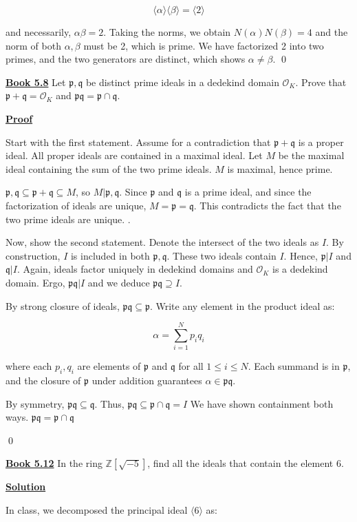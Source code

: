 \documentclass{article}
\newcommand{\new}[1]{
    \vspace{2mm}
    \noindent
    \textbf{
    \underline{#1}}
}
\def\ZZ{{\mathbb{Z}}}
\newcommand{\Proof}{{
    \vspace{2mm}
    \noindent
    \textbf{
    \underline{Proof}}
}
}
\newcommand{\<}{{{
    \langle
}}}
\def\>{{{
    \rangle
}}}
\def\ZZ{{\mathbb{Z}}}
\newcommand{\ringInt}{
    {\mathcal{O}}
}
\newcommand{\pideal}{
    {{\mathfrak{p}}}
}
\newcommand{\qideal}{
    {{\mathfrak{q}}}
}
\begin{document}
\[
    \<\alpha\>\<\beta\> = \<2\>
\]

and necessarily, $\alpha\beta = 2$. Taking the norms, we obtain 
$N(\alpha)N(\beta) = 4$ and the norm of both $\alpha, \beta$ must 
be 2, which is prime. We have factorized 2 into two primes, 
and the two generators are distinct, which shows $\alpha \neq \beta$. 
\qed


\newpage
\new{Book 5.8} Let $\pideal, \qideal$ be distinct prime ideals in 
a dedekind domain $\ringInt_K$. Prove that $\pideal + \qideal = \ringInt_K$
and $\pideal \qideal = \pideal \cap \qideal$. 

\Proof 
Start with the first statement. Assume for a contradiction that 
$\pideal + \qideal$ is a proper ideal. All proper ideals are 
contained in a maximal ideal. Let $M$ be the maximal ideal containing 
the sum of the two prime ideals. $M$ is maximal, hence prime. 

$\pideal, \qideal \subseteq \pideal + \qideal \subseteq M$, so 
$M|\pideal, \qideal$. Since $\pideal$ and $\qideal$ is a prime ideal, 
and since the factorization of ideals are unique, $M = \pideal = \qideal$. 
This contradicts the fact that the two prime ideals are unique. 
\checkmark. 

Now, show the second statement. Denote the intersect of the two 
ideals as $I$. By construction, $I$ is included in both 
$\pideal, \qideal$. These two ideals contain $I$. Hence, $\pideal|I$ and $\qideal|I$. 
Again, ideals factor uniquely in dedekind domains and $\ringInt_K$ 
is a dedekind domain. Ergo, $\pideal \qideal | I$ and we deduce 
$\pideal \qideal \supseteq I$. 

By strong closure of ideals, $\pideal\qideal \subseteq \pideal$. 
Write any element in the product ideal as:

\[
    \alpha = \sum_{i = 1}^{N} p_iq_i 
\]

where each $p_i, q_i$ are elements of $\pideal$ and $\qideal$ for 
all $1\leq i \leq N$. Each summand is in $\pideal$, and the closure 
of $\pideal$ under addition guarantees $\alpha \in \pideal \qideal$. 

By symmetry, $\pideal \qideal \subseteq \qideal$. Thus, $\pideal \qideal \subseteq \pideal \cap \qideal = I$
We have shown containment both ways. $\pideal \qideal = \pideal \cap \qideal$

\qed

\new{Book 5.12} In the ring $\ZZ[\sqrt{-5}]$, find all the ideals 
that contain the element $6$. 

\new{Solution}
In class, we decomposed the principal ideal $\<6\>$ as:
\end{document}
